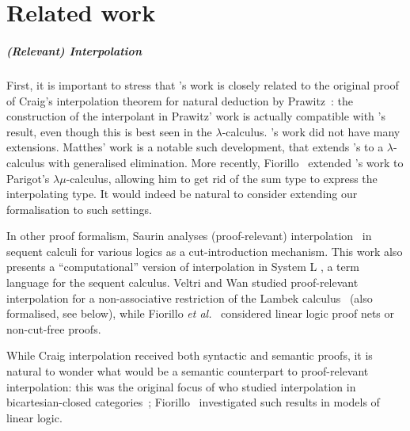 \documentclass[a4paper,UKenglish,cleveref, autoref, thm-restate]{lipics-v2021}
\begin{document}
\section{Related work}
\label{sec:related}


\subparagraph*{(Relevant) Interpolation} 
First, it is important to stress that \Cubric's work is closely related to the original proof of Craig's interpolation theorem for natural deduction by Prawitz~\cite{Prawitz1965-PRANDA}: the construction of the interpolant in Prawitz' work is actually compatible with \Cubric's result, even though this is best seen in the $\lambda$-calculus. 
\Cubric's work did not have many extensions.
Matthes' \cite{Matthes-interpolation-01} work is a notable such development, that extends \Cubric's to a $\lambda$-calculus with generalised elimination. More recently, Fiorillo~\cite{Fiorillo2024} extended \Cubric's work to Parigot's $\lambda\mu$-calculus, allowing him to get rid of the sum type to express the interpolating type. It would indeed be natural to consider extending our formalisation to such settings.

In other proof formalism, Saurin analyses (proof-relevant) interpolation~\cite{Saurin25fscd} in sequent calculi for various logics
as a cut-introduction mechanism. This work also presents a ``computational'' version of interpolation in System L \cite{Curien2000,MunchMaccagnoni2013},
a term language for the sequent calculus.
Veltri and Wan studied proof-relevant interpolation for a non-associative restriction of the Lambek calculus~\cite{VeltriW25} (also formalised, see below), while
Fiorillo \textit{et al.}~\cite{Fiorillo2025} considered
linear logic proof nets or non-cut-free proofs.

While Craig interpolation received both syntactic and semantic proofs, it is natural to wonder what would be a semantic counterpart to proof-relevant interpolation: this was the original focus of \Cubric who studied interpolation in bicartesian-closed categories~\cite{Cubricphd,Cubric1994}; Fiorillo~\cite{Fiorillo2024} investigated such results in models of linear logic.
\end{document}

